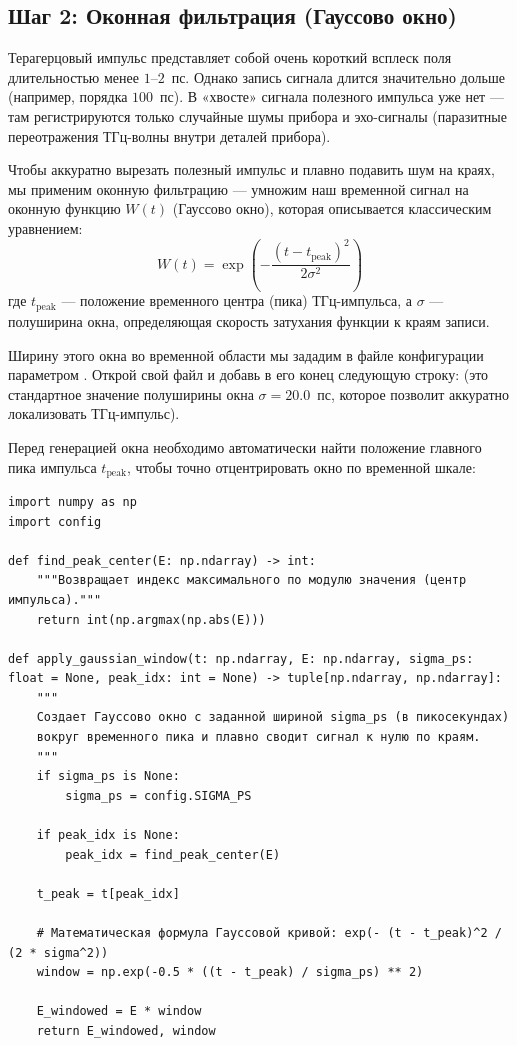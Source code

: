 \subsection{Шаг 2: Оконная фильтрация (Гауссово окно)}

Терагерцовый импульс представляет собой очень короткий всплеск поля длительностью менее $1$--$2$~пс. Однако запись сигнала длится значительно дольше (например, порядка $100$~пс). В «хвосте» сигнала полезного импульса уже нет — там регистрируются только случайные шумы прибора и эхо-сигналы (паразитные переотражения ТГц-волны внутри деталей прибора).

Чтобы аккуратно вырезать полезный импульс и плавно подавить шум на краях, мы применим оконную фильтрацию — умножим наш временной сигнал на оконную функцию $W(t)$ (Гауссово окно), которая описывается классическим уравнением:
\begin{equation}
W(t) = \exp\left( -\frac{(t - t_{\text{peak}})^2}{2\sigma^2} \right)
\end{equation}
где $t_{\text{peak}}$ — положение временного центра (пика) ТГц-импульса, а $\sigma$ — полуширина окна, определяющая скорость затухания функции к краям записи. 

Ширину этого окна во временной области мы зададим в файле конфигурации  параметром . Открой свой файл  и добавь в его конец следующую строку:  (это стандартное значение полуширины окна $\sigma = 20.0$~пс, которое позволит аккуратно локализовать ТГц-импульс).

Перед генерацией окна необходимо автоматически найти положение главного пика импульса $t_{\text{peak}}$, чтобы точно отцентрировать окно по временной шкале:

\begin{listing}[H]
	\caption{Центрирование и наложение Гауссова окна ()}
	\begin{verbatim}
import numpy as np
import config

def find_peak_center(E: np.ndarray) -> int:
    """Возвращает индекс максимального по модулю значения (центр импульса)."""
    return int(np.argmax(np.abs(E)))

def apply_gaussian_window(t: np.ndarray, E: np.ndarray, sigma_ps: float = None, peak_idx: int = None) -> tuple[np.ndarray, np.ndarray]:
    """
    Создает Гауссово окно с заданной шириной sigma_ps (в пикосекундах) 
    вокруг временного пика и плавно сводит сигнал к нулю по краям.
    """
    if sigma_ps is None:
        sigma_ps = config.SIGMA_PS
        
    if peak_idx is None:
        peak_idx = find_peak_center(E)
        
    t_peak = t[peak_idx]
    
    # Математическая формула Гауссовой кривой: exp(- (t - t_peak)^2 / (2 * sigma^2))
    window = np.exp(-0.5 * ((t - t_peak) / sigma_ps) ** 2)
    
    E_windowed = E * window
    return E_windowed, window
	\end{verbatim}
\end{listing}



